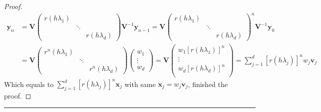\documentclass[a4paper, 10pt]{article}
\theoremstyle{definition}
\theoremstyle{hSol}
\begin{document}
\begin{proof}
\begin{equation}
  \begin{split}
    \bm{y}_{n} &= \bm{V} \begin{pmatrix}
       r(h \lambda_1) \\
       & \ddots \\
       & & r(h \lambda_d)
     \end{pmatrix} \bm{V}^{-1} \bm{y}_{n-1}
    = \bm{V} \begin{pmatrix}
       r(h \lambda_1) \\
       & \ddots \\
       & & r(h \lambda_d)
     \end{pmatrix}^n \bm{V}^{-1} \bm{y}_0 \\
     &=\bm{V} \begin{pmatrix}
       r^n(h \lambda_1) \\
       & \ddots \\
       & & r^n(h \lambda_d)
     \end{pmatrix}
     \begin{pmatrix}
       w_1 \\
       \vdots\\
       w_d
     \end{pmatrix} = 
     \bm{V} \begin{pmatrix}
       w_1 [r(h\lambda_1)]^n \\
       \vdots \\
       w_d [r(h\lambda_d)]^n \\
     \end{pmatrix} = \sum_{j=1}^d [r(h \lambda_j)]^n w_j \bm{v}_j
  \end{split}
\end{equation}
Which equals to $\sum_{j=1}^d [r(h \lambda_j)]^n \bm{x}_j$ with same $\bm{x}_j=w_j \bm{v}_j$, finished the proof.

\end{proof} 
\noindent\rule{16cm}{0.4pt}
\end{document}
